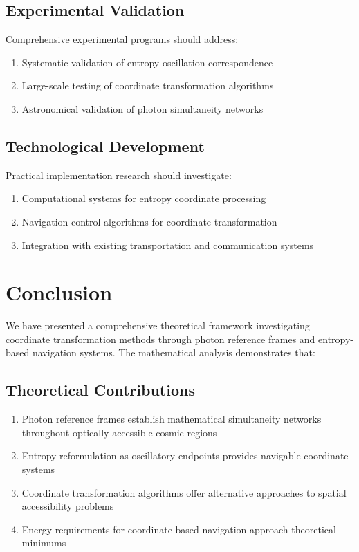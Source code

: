 \documentclass[12pt,a4paper]{article}
\begin{document}
\subsection{Experimental Validation}

Comprehensive experimental programs should address:

\begin{enumerate}
\item Systematic validation of entropy-oscillation correspondence  
\item Large-scale testing of coordinate transformation algorithms
\item Astronomical validation of photon simultaneity networks
\end{enumerate}

\subsection{Technological Development}

Practical implementation research should investigate:

\begin{enumerate}
\item Computational systems for entropy coordinate processing
\item Navigation control algorithms for coordinate transformation
\item Integration with existing transportation and communication systems
\end{enumerate}

\section{Conclusion}

We have presented a comprehensive theoretical framework investigating coordinate transformation methods through photon reference frames and entropy-based navigation systems. The mathematical analysis demonstrates that:

\subsection{Theoretical Contributions}

\begin{enumerate}
\item Photon reference frames establish mathematical simultaneity networks throughout optically accessible cosmic regions
\item Entropy reformulation as oscillatory endpoints provides navigable coordinate systems
\item Coordinate transformation algorithms offer alternative approaches to spatial accessibility problems
\item Energy requirements for coordinate-based navigation approach theoretical minimums
\end{enumerate}
\end{document}
